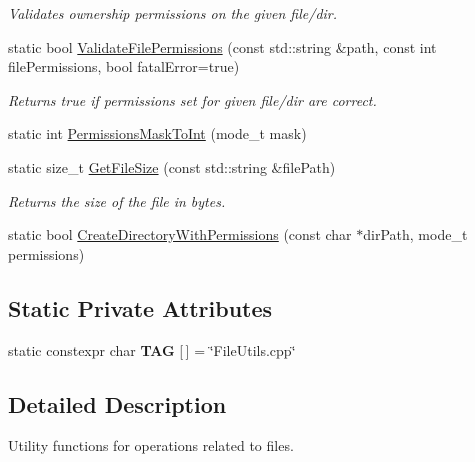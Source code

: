 \begin{DoxyCompactItemize}
\begin{DoxyCompactList}\small\item\em Validates ownership permissions on the given file/dir. \end{DoxyCompactList}\item 
static bool \hyperlink{class_aws_1_1_iot_1_1_device_client_1_1_util_1_1_file_utils_a9ea83b4248bea73525919cca6bb8c39d}{Validate\+File\+Permissions} (const std\+::string \&path, const int file\+Permissions, bool fatal\+Error=true)
\begin{DoxyCompactList}\small\item\em Returns true if permissions set for given file/dir are correct. \end{DoxyCompactList}\item 
static int \hyperlink{class_aws_1_1_iot_1_1_device_client_1_1_util_1_1_file_utils_af165bb643fa6c8aa0d6beace43275dcd}{Permissions\+Mask\+To\+Int} (mode\+\_\+t mask)
\item 
static size\+\_\+t \hyperlink{class_aws_1_1_iot_1_1_device_client_1_1_util_1_1_file_utils_a8f59952c80127b314abba046876830c0}{Get\+File\+Size} (const std\+::string \&file\+Path)
\begin{DoxyCompactList}\small\item\em Returns the size of the file in bytes. \end{DoxyCompactList}\item 
static bool \hyperlink{class_aws_1_1_iot_1_1_device_client_1_1_util_1_1_file_utils_a28fa5c453d546e54b07de465370b2b2e}{Create\+Directory\+With\+Permissions} (const char $\ast$dir\+Path, mode\+\_\+t permissions)
\end{DoxyCompactItemize}
\subsection*{Static Private Attributes}
\begin{DoxyCompactItemize}
\item 
\mbox{\label{class_aws_1_1_iot_1_1_device_client_1_1_util_1_1_file_utils_acea40b3e18d2999c94926e029eff0959}} 
static constexpr char {\bfseries T\+AG} \mbox{[}$\,$\mbox{]} = \char`\"{}File\+Utils.\+cpp\char`\"{}
\end{DoxyCompactItemize}


\subsection{Detailed Description}
Utility functions for operations related to files. 

